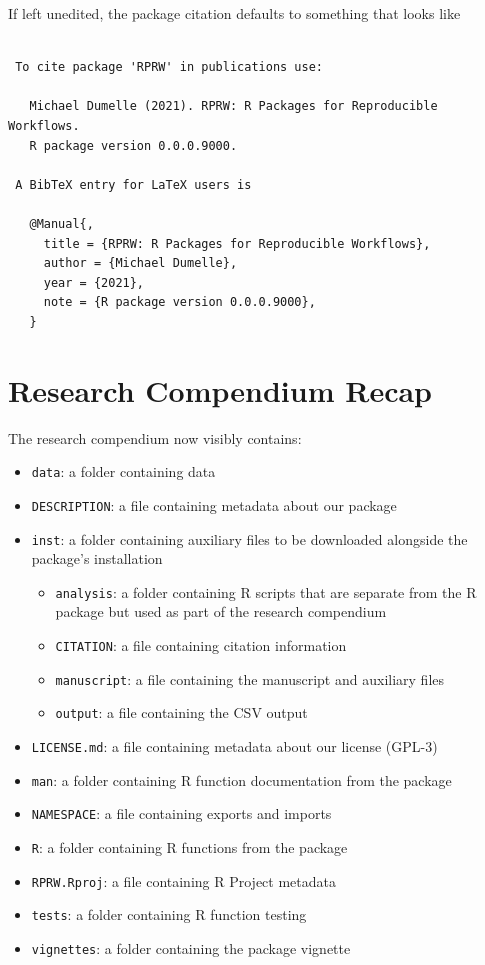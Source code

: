 \documentclass[
]{book}
\providecommand{\tightlist}{%
  \setlength{\itemsep}{0pt}\setlength{\parskip}{0pt}}
\begin{document}
If left unedited, the package citation defaults to something that looks like

\begin{verbatim}
 
 To cite package 'RPRW' in publications use:
 
   Michael Dumelle (2021). RPRW: R Packages for Reproducible Workflows.
   R package version 0.0.0.9000.
 
 A BibTeX entry for LaTeX users is
 
   @Manual{,
     title = {RPRW: R Packages for Reproducible Workflows},
     author = {Michael Dumelle},
     year = {2021},
     note = {R package version 0.0.0.9000},
   }
\end{verbatim}

\hypertarget{rc-recap}{%
\section{Research Compendium Recap}\label{rc-recap}}

The research compendium now visibly contains:

\begin{itemize}
\tightlist
\item
  \texttt{data}: a folder containing data
\item
  \texttt{DESCRIPTION}: a file containing metadata about our package
\item
  \texttt{inst}: a folder containing auxiliary files to be downloaded alongside the package's installation

  \begin{itemize}
  \tightlist
  \item
    \texttt{analysis}: a folder containing R scripts that are separate from the R package but used as part of the research compendium
  \item
    \texttt{CITATION}: a file containing citation information
  \item
    \texttt{manuscript}: a file containing the manuscript and auxiliary files
  \item
    \texttt{output}: a file containing the CSV output
  \end{itemize}
\item
  \texttt{LICENSE.md}: a file containing metadata about our license (GPL-3)
\item
  \texttt{man}: a folder containing R function documentation from the package
\item
  \texttt{NAMESPACE}: a file containing exports and imports
\item
  \texttt{R}: a folder containing R functions from the package
\item
  \texttt{RPRW.Rproj}: a file containing R Project metadata
\item
  \texttt{tests}: a folder containing R function testing
\item
  \texttt{vignettes}: a folder containing the package vignette
\end{itemize}
\end{document}
